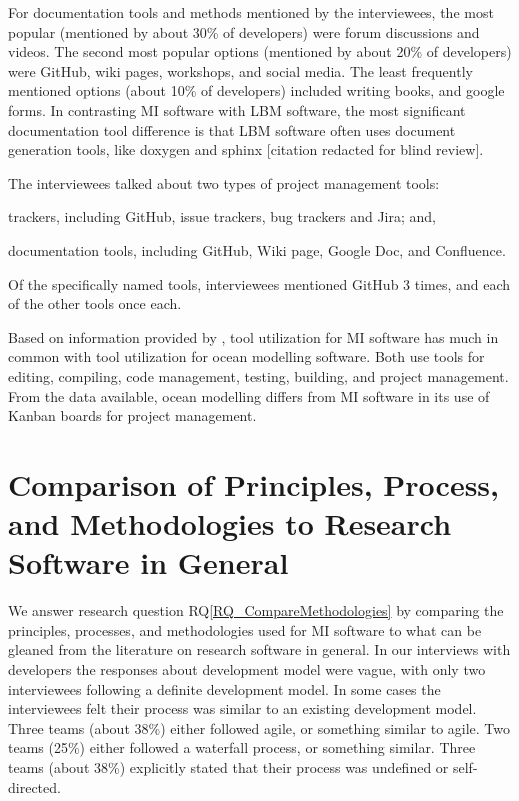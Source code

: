 \documentclass[final, 12pt, 3p, times]{elsarticle}
\newcommand{\rqref}[1]{RQ\ref{#1}}
\begin{document}
For documentation tools and methods mentioned by the interviewees, the most
popular (mentioned by about 30\% of developers) were forum discussions and
videos.  The second most popular options (mentioned by about 20\% of developers)
were GitHub, wiki pages, workshops, and social media. The least frequently
mentioned options (about 10\% of developers) included writing books, and google
forms.  In contrasting MI software with LBM software, the most significant
documentation tool difference is that LBM software often uses document
generation tools, like doxygen and sphinx [citation redacted for blind review].

The interviewees talked about two types of project management tools:
\begin{inparaenum}[i)]
\item trackers, including GitHub, issue trackers, bug trackers and Jira; and,
\item documentation tools, including GitHub, Wiki page, Google Doc, and
Confluence.
\end{inparaenum}
Of the specifically named tools, interviewees mentioned GitHub 3 times, and each
of the other tools once each.

Based on information provided by \cite{JungEtAl2022}, tool utilization for MI
software has much in common with tool utilization for ocean modelling software.
Both use tools for editing, compiling, code management, testing, building, and
project management.  From the data available, ocean modelling differs from MI
software in its use of Kanban boards for project management.

\section[Comparison to Other Research Software]{Comparison of Principles, Process, and
Methodologies to Research Software in General} \label{Sec_CompareMethodologies}

We answer research question \rqref{RQ_CompareMethodologies} by comparing the
principles, processes, and methodologies used for MI software to what can be
gleaned from the literature on research software in general. In our interviews
with developers the responses about development model were vague, with only two
interviewees following a definite development model. In some cases the
interviewees felt their process was similar to an existing development model.
Three teams (about 38\%) either followed agile, or something similar to agile.
Two teams (25\%) either followed a waterfall process, or something similar.
Three teams (about 38\%) explicitly stated that their process was undefined or
self-directed.
\end{document}
